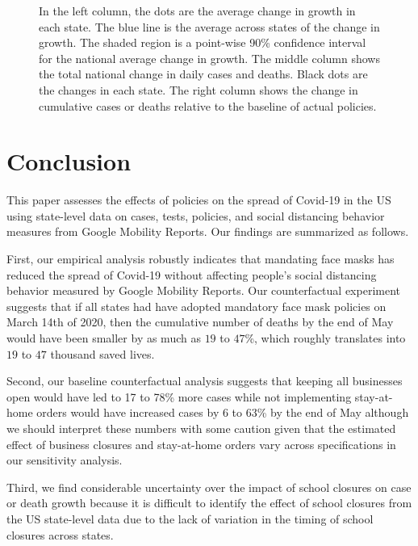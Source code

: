 \documentclass[11pt,reqno,letter]{amsart}
\theoremstyle{definition}
\begin{document}
\begin{figure}[ht]
\begin{minipage}{\linewidth}
    \begin{flushleft}
      \footnotesize In the left column, the dots are the average
      change in growth in each state. The blue line is the average
      across states of the change in growth. The shaded region is a
      point-wise 90\% confidence interval for the national average
      change in growth.  The middle column shows the total national
      change in daily cases and deaths. Black dots are the changes in each
      state.  The right column shows the change in cumulative cases or
      deaths relative to the baseline of actual policies.
    \end{flushleft}
  \end{minipage}
\end{figure}




\afterpage{\clearpage}

\section{Conclusion}


This paper assesses the effects of policies on the spread of Covid-19 in the US using state-level data on cases, tests, policies, and social distancing behavior measures from Google Mobility Reports. Our findings are summarized as follows.

First, our empirical analysis robustly indicates that mandating face masks has
reduced the spread of Covid-19 without affecting people's social
distancing behavior measured by Google Mobility Reports. Our
counterfactual experiment suggests that
if all states had have adopted mandatory face mask policies on March 14th of 2020, then the cumulative number of deaths by the end of May would have been smaller by as much as  $19$ to $47$\%, which roughly translates into $19$ to $47$  thousand saved lives.
  
Second, our baseline counterfactual analysis suggests that keeping all businesses open would have led to 17 to 78\% more cases  while not implementing stay-at-home orders would have increased cases by 6 to 63\% by the end of May although we should interpret these numbers with some caution given that the estimated effect of business closures and stay-at-home orders vary across specifications in our sensitivity analysis. 

Third, we find considerable uncertainty over  the impact of school closures on case or death growth because it is difficult to identify the effect of school closures from the US state-level data due to the lack of variation in the timing of school closures across states.
\end{document}
